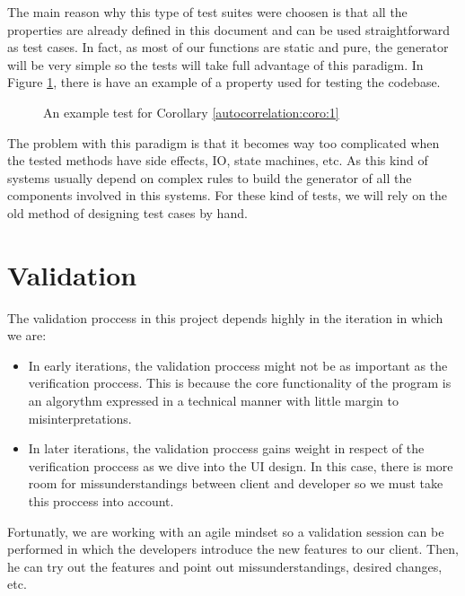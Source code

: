     The main reason why this type of test suites were choosen is that all the
    properties are already defined in this document and can be used
    straightforward as test cases. In fact, as most of our functions
    are static and pure, the generator will be very simple so the
    tests will take full advantage of this paradigm. In Figure \ref{test_example},
    there is have an example of a property used for testing the codebase.\\

    \begin{figure}[ht!]
      \caption{An example test for Corollary \ref{autocorrelation:coro:1}}
      \label{test_example}
    \end{figure}

    The problem with this paradigm is that it becomes way too complicated when
    the tested methods have side effects, IO, state machines, etc. As this
    kind of systems usually depend on complex rules to build the generator of
    all the components involved in this systems. For these kind of tests, we
    will rely on the old method of designing test cases by hand.\\

\section{Validation}

The validation proccess in this project depends highly in the iteration in which
we are:

\begin{itemize}
  \item In early iterations, the validation proccess might not be as important
  as the verification proccess. This is because the core functionality of the
  program is an algorythm expressed in a technical manner with little margin
  to misinterpretations.
  \item In later iterations, the validation proccess gains weight in respect of
  the verification proccess as we dive into the UI design. In this case, there
  is more room for missunderstandings between client and developer so we must
  take this proccess into account.
\end{itemize}

Fortunatly, we are working with an agile mindset so a validation
session can be performed in which the developers introduce the new features to our
client. Then, he can try out the features and point out missunderstandings, desired changes, etc.\\
